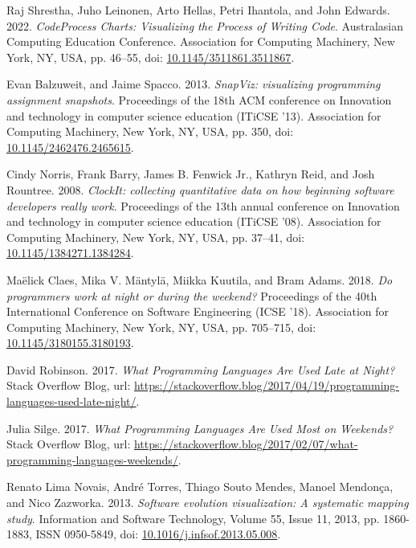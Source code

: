 \begin{thebibliography}{99}
 Raj Shrestha, Juho Leinonen, Arto Hellas, Petri Ihantola, and John Edwards. 2022. \textit{CodeProcess Charts: Visualizing the Process of Writing Code}. Australasian Computing Education Conference. Association for Computing Machinery, New York, NY, USA, pp. 46–55, doi: \href{https://doi.org/10.1145/3511861.3511867}{10.1145/3511861.3511867}.

 Evan Balzuweit, and Jaime Spacco. 2013. \textit{SnapViz: visualizing programming assignment snapshots}. Proceedings of the 18th ACM conference on Innovation and technology in computer science education (ITiCSE '13). Association for Computing Machinery, New York, NY, USA, pp. 350, doi: \href{https://doi.org/10.1145/2462476.2465615}{10.1145/2462476.2465615}.

 Cindy Norris, Frank Barry, James B. Fenwick Jr., Kathryn Reid, and Josh Rountree. 2008. \textit{ClockIt: collecting quantitative data on how beginning software developers really work}. Proceedings of the 13th annual conference on Innovation and technology in computer science education (ITiCSE '08). Association for Computing Machinery, New York, NY, USA, pp. 37–41, doi: \href{https://doi.org/10.1145/1384271.1384284}{10.1145/1384271.1384284}.

 Maëlick Claes, Mika V. Mäntylä, Miikka Kuutila, and Bram Adams. 2018. \textit{Do programmers work at night or during the weekend?} Proceedings of the 40th International Conference on Software Engineering (ICSE '18). Association for Computing Machinery, New York, NY, USA, pp. 705–715, doi: \href{https://doi.org/10.1145/3180155.3180193}{10.1145/3180155.3180193}.

 David Robinson. 2017. \textit{What Programming Languages Are Used Late at Night?} Stack Overflow Blog, url: \url{https://stackoverflow.blog/2017/04/19/programming-languages-used-late-night/}.

 Julia Silge. 2017. \textit{What Programming Languages Are Used Most on Weekends?} Stack Overflow Blog, url: \url{https://stackoverflow.blog/2017/02/07/what-programming-languages-weekends/}.

 Renato Lima Novais, André Torres, Thiago Souto Mendes, Manoel Mendonça, and Nico Zazworka. 2013. \textit{Software evolution visualization: A systematic mapping study}. Information and Software Technology, Volume 55, Issue 11, 2013, pp. 1860-1883, ISSN 0950-5849, doi: \href{https://doi.org/10.1016/j.infsof.2013.05.008}{10.1016/j.infsof.2013.05.008}.


\end{thebibliography}
